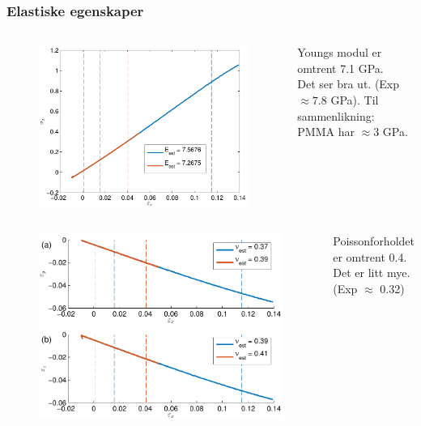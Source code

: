 \documentclass[utf8x, notes, graphics]{beamer}
\begin{document}
\begin{frame}
\frametitle{Elastiske egenskaper}
{
	\begin{columns}
	\begin{figure}
		\includegraphics[width=\textwidth]{../figures/thesis/stress_strain_11_11_11_tip4p_ice_uam.pdf}
	\end{figure}
	Youngs modul er omtrent 7.1 GPa.\\
	\vspace{3mm}
	Det ser bra ut. (Exp $\approx 7.8$ GPa).
	Til sammenlikning: PMMA har $\approx 3$ GPa.
	\end{columns}
}
{
	\begin{columns}
	\column{0.7\textwidth}
	\begin{figure}
		\includegraphics[width=\textwidth]{../figures/thesis/strain_strain_11_11_11_y_z_poisson_tip4p_ice_uam.pdf}
	\end{figure}
	\column{0.3\textwidth}
	Poissonforholdet er omtrent 0.4.\\
	\vspace{3mm}
	Det er litt mye. (Exp $\approx$ 0.32)
	\end{columns}
}
\end{frame}
\end{document}
